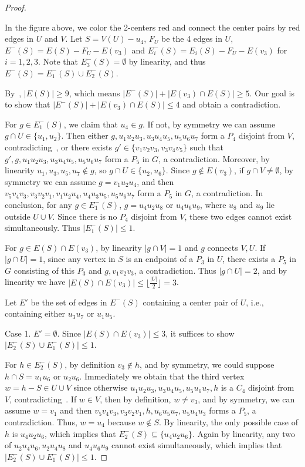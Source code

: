 \documentclass[10pt,a4paper]{amsart}
\newcommand{\emphd}[1]{{\fontseries{b}\selectfont\textsf{#1}}}
\begin{document}
\begin{proof}
\begin{figure}[h]
\begin{tikzpicture}[scale=0.7, every node/.style={circle, fill, inner sep=1.2pt}]
\end{tikzpicture}	
\end{figure}

	In the figure above, we color the 2-centers red and connect the center pairs by red edges in $U$ and $V$. Let $S=V(U)-u_4$, $F_U$ be the 4 edges in $U$, $E^-(S) =E(S)-F_U-E(v_3)$ and $E_i^-(S) = E_i(S)-F_U-E(v_3)$ for $i=1,2,3$. Note that $E_3^-(S)=\emptyset$ by linearity, and thus $E^-(S) = E_1^-(S)\cup E_2^-(S)$. 
    
    By~, $|E(S)|\ge 9$, which means $|E^-(S)|+|E(v_3)\cap E(S)|\ge 5$. Our goal is to show that $|E^-(S)|+|E(v_3)\cap E(S)|\leq 4$ and obtain a contradiction. 

    For $g\in E_1^-(S)$, we claim that $u_4\in g$. If not, by symmetry we can assume $g\cap U\in\{u_1,u_2\}$. Then either $g,u_1u_2u_3,u_3u_4u_5,u_5u_6u_7$ form a $P_4$ disjoint from $V$, contradicting~,
    or there exists $g'\in\{v_1v_2v_3,v_3v_4v_5\}$ such that $g',g,u_1u_2u_3,u_3u_4u_5,u_5u_6u_7$ form a $P_5$ in $G$, a contradiction. Moreover, by linearity $u_1,u_3,u_5,u_7\notin g$, so $g\cap U\in \{u_2,u_6\}$. Since $g\notin E(v_3)$, if $g\cap V\neq \emptyset$, by symmetry we can assume $g=v_1u_2u_4$, 
    and then $v_5v_4v_3,v_3v_2v_1,v_1u_2u_4,u_4u_3u_5,u_5u_6u_7$ form a $P_5$ in $G$, a contradiction. In conclusion, for any $g\in E_1^-(S)$, $g=u_4u_2u_8$ or $u_4u_6u_9$, where $u_8$ and $u_9$ lie outside $U\cup V$. Since there is no $P_4$ disjoint from $V$, these two edges cannot exist simultaneously. Thus $|E_1^-(S)|\le 1$.

    For $g\in E(S)\cap E(v_3)$, by linearity $|g\cap V|=1$ and $g$ connects $V,U$. If $|g\cap U|=1$, since any vertex in $S$ is an endpoint of a $P_3$ in $U$, there exists a $P_5$ in $G$ consisting of this $P_3$ and $g, v_1v_2v_3$, a contradiction. Thus $|g\cap U|=2$, and by linearity we have $|E(S)\cap E(v_3)|\le \lfloor\frac{|U|}{2}\rfloor=3$.

     Let $E'$ be the set of edges in $E^-(S)$ containing a center pair of $U$, i.e., containing either $u_3u_7$ or $u_1u_5$.
    
    \emphd{Case 1.} $E'=\emptyset$. Since $|E(S)\cap E(v_3)|\le 3$, it suffices to show $|E_2^-(S)\cup E_1^-(S)|\le 1$.
    
    For $h \in E_2^-(S)$, by definition $v_3\notin h$, and by symmetry, we could suppose $h\cap S=u_1u_6$ or $u_2u_6$. Immediately we obtain that the third vertex $w= h-S\in U\cup V$ since otherwise $u_1u_2u_3,u_3u_4u_5,u_5u_6u_7,h$ is a $C_4$ disjoint from $V$, contradicting~. If $w\in V$, then by definition, $w\neq v_3$, and by symmetry, we can assume $w=v_1$ and then $v_5v_4v_3,v_3v_2v_1,h,u_6u_5u_7,u_5u_4u_3$ forms a $P_5$, a contradiction. Thus, $w=u_4$ because $w\notin S$. By linearity, the only possible case of $h$ is $u_4u_2u_6$, which implies that $E_2^-(S)\subseteq\{u_4u_2u_6\}$. Again by linearity, any two of $u_2u_4u_6,u_2u_4u_8$ and $u_4u_6u_9$ cannot exist simultaneously, which implies that $|E_2^-(S)\cup E_1^-(S)|\le 1$. 


\end{proof}
\end{document}
